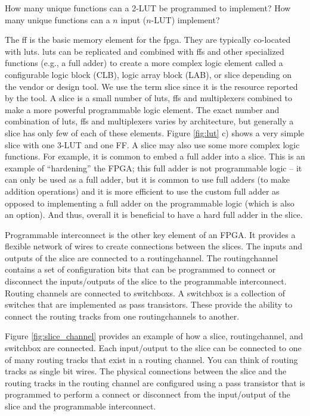 \begin{exercise}
How many unique functions can a 2-LUT be programmed to implement? How many unique functions can a $n$ input ($n$-LUT) implement? 
\end{exercise}

The \gls{ff} is the basic memory element for the \gls{fpga}. They are typically co-located with \glspl{lut}. \gls{lut}s can be replicated and combined with \glspl{ff} and other specialized functions (e.g., a full adder) to create a more complex logic element called a configurable logic block (CLB), logic array block (LAB), or \gls{slice} depending on the vendor or design tool. We use the term \gls{slice} since it is the resource reported by the \VHLS tool.  A \gls{slice} is a small number of \glspl{lut}, \glspl{ff} and multiplexers combined to make a more powerful programmable logic element. The exact number and combination of  \glspl{lut}, \glspl{ff} and multiplexers varies by architecture, but generally a slice has only few of each of these elements. Figure \ref{fig:lut} c) shows a very simple slice with one 3-LUT and one FF. A \gls{slice} may also use some more complex logic functions. For example, it is common to embed a full adder into a slice. This is an example of ``hardening'' the FPGA; this full adder is not programmable logic -- it can only be used as a full adder, but it is common to use full adders (to make addition operations) and it is more efficient to use the custom full adder as opposed to implementing a full adder on the programmable logic (which is also an option). And thus, overall it is beneficial to have a hard full adder in the slice.

Programmable interconnect is the other key element of an FPGA. It provides a flexible network of wires to create connections between the slices. The inputs and outputs of the \gls{slice} are connected to a \gls{routingchannel}. The \gls{routingchannel} contains a set of configuration bits that can be programmed to connect or disconnect the inputs/outputs of the \gls{slice} to the programmable interconnect. Routing channels are connected to \glspl{switchbox}. A \gls{switchbox} is a collection of switches that are implemented as pass transistors. These provide the ability to connect the routing tracks from one \glspl{routingchannel} to another. 

Figure \ref{fig:slice_channel} provides an example of how a \gls{slice}, \gls{routingchannel}, and \gls{switchbox} are connected. Each input/output to the \gls{slice} can be connected to one of many routing tracks that exist in a routing channel. You can think of routing tracks as single bit wires. The physical connections between the slice and the routing tracks in the routing channel are configured using a pass transistor that is programmed to perform a connect or disconnect from the input/output of the slice and the programmable interconnect. 

